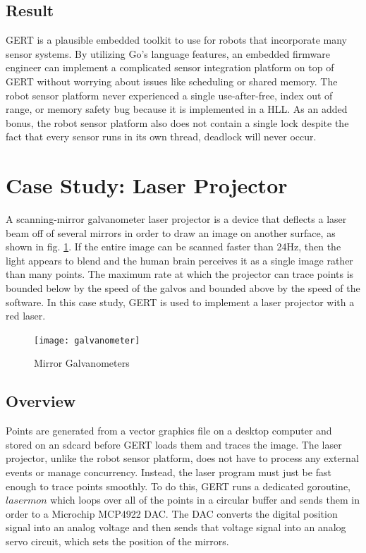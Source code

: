 \subsection{Result}
GERT is a plausible embedded toolkit to use for robots that incorporate many sensor systems.
By utilizing Go's language features, an embedded firmware engineer can implement a complicated sensor integration
platform on top of GERT without worrying about issues like scheduling or shared memory. The robot sensor platform
never experienced a single use-after-free, index out of range, or memory safety bug because it is implemented in a HLL.
As an added bonus, the robot sensor platform also does not contain a single lock despite the fact that every sensor
runs in its own thread, deadlock will never occur.



\section{Case Study: Laser Projector}\label{sec:laser}
A scanning-mirror galvanometer laser projector is a device that deflects a laser beam off of several mirrors in
order to draw an image on another surface, as shown in fig. \ref{fig:galvos}. If the entire image can be scanned faster than 24Hz, then the light appears
to blend and the human brain perceives it as a single image rather than many points. The maximum rate at which the
projector can trace points is bounded below by the speed of the galvos and bounded above by the speed of the software.
In this case study, GERT is used to implement a laser projector with a red laser.

\begin{figure}[h]
\begin{center}
  \texttt{[image: galvanometer]}
\end{center}
  \caption{Mirror Galvanometers} \label{fig:galvos}
\end{figure}

\subsection{Overview}
Points are generated from a vector graphics file on a desktop computer and stored
on an sdcard before GERT loads them and traces the image. The laser projector,
unlike the robot sensor platform, does not have to process any external events or
manage concurrency.
Instead, the laser program must just be fast enough to trace points smoothly.
To do this, GERT runs a dedicated goroutine, $lasermon$ which loops over all of the points
in a circular buffer and sends them in order to a Microchip MCP4922 DAC. The
DAC converts the digital position signal into an analog voltage and then
sends that voltage signal into an analog servo circuit, which sets the position
of the mirrors.


